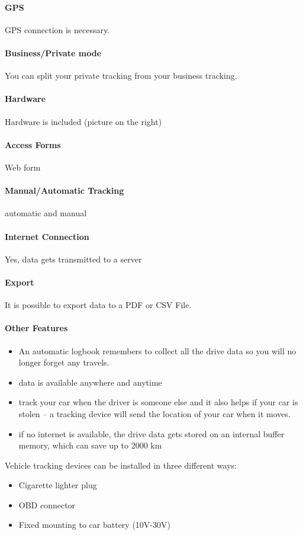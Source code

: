 \paragraph{GPS} GPS connection is necessary.
\paragraph{Business/Private mode}You can split your private tracking from your business tracking.
\paragraph{Hardware}Hardware is included (picture on the right)
\paragraph{Access Forms}Web form
\paragraph{Manual/Automatic Tracking}automatic and manual
\paragraph{Internet Connection}Yes, data gets transmitted to a server
\paragraph{Export}It is  possible to export data to a PDF or CSV File.
\paragraph{Other Features}
\begin{itemize}
\item An automatic logbook remembers to collect all the drive data so you will no longer forget any travels.
\item data is available anywhere and anytime
\item track your car when the driver is someone else and it also helps if your car is stolen – a tracking device will send the location of your car when it moves.
\item if no internet is available, the drive data gets stored on an internal buffer memory, which can save up to 2000 km
\end{itemize}
Vehicle tracking devices can be installed in three different ways:
\begin{itemize}
\item Cigarette lighter plug
\item OBD connector
\item Fixed mounting to car battery (10V-30V)
\end{itemize}
